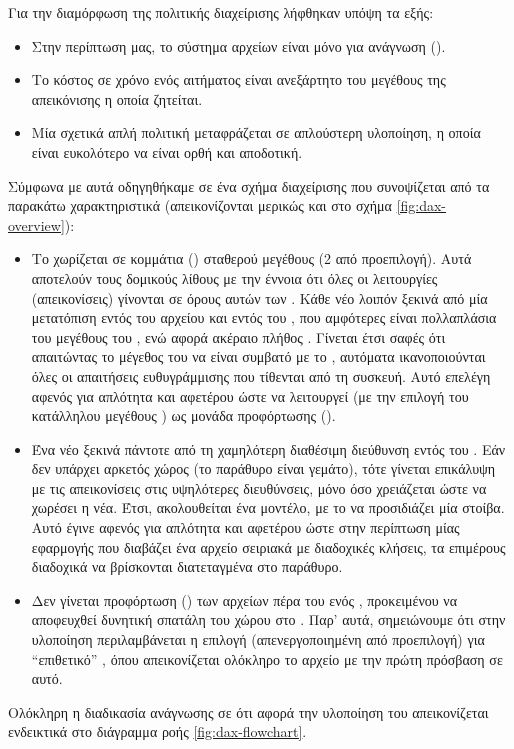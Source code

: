 Για την διαμόρφωση της πολιτικής διαχείρισης λήφθηκαν υπόψη τα εξής:
\begin{itemize}
    \item Στην περίπτωση μας, το σύστημα αρχείων είναι μόνο για ανάγνωση
          ().
    \item Το κόστος σε χρόνο ενός αιτήματος  είναι
          ανεξάρτητο του μεγέθους της απεικόνισης η οποία ζητείται.
    \item Μία σχετικά απλή πολιτική μεταφράζεται σε απλούστερη υλοποίηση,
          η οποία είναι ευκολότερο να είναι ορθή και αποδοτική.
\end{itemize}
Σύμφωνα με αυτά οδηγηθήκαμε σε ένα σχήμα διαχείρισης που συνοψίζεται από τα
παρακάτω χαρακτηριστικά (απεικονίζονται μερικώς και στο σχήμα
\ref{fig:dax-overview}):
\begin{itemize}
    \item Το  χωρίζεται σε κομμάτια (\emph{}) σταθερού
          μεγέθους (2  από προεπιλογή). Αυτά αποτελούν τους δομικούς
          λίθους με την έννοια ότι όλες οι λειτουργίες (απεικονίσεις) γίνονται
          σε όρους αυτών των . Κάθε νέο  λοιπόν ξεκινά
          από μία μετατόπιση εντός του αρχείου και εντός του ,
          που αμφότερες είναι πολλαπλάσια του μεγέθους του , ενώ αφορά
          ακέραιο πλήθος . Γίνεται έτσι σαφές ότι απαιτώντας το
          μέγεθος του  να είναι συμβατό με το ,
          αυτόματα ικανοποιούνται όλες οι απαιτήσεις ευθυγράμμισης που τίθενται
          από τη \viofs{} συσκευή. Αυτό επελέγη αφενός για απλότητα και αφετέρου
          ώστε να λειτουργεί (με την επιλογή του κατάλληλου μεγέθους )
          ως μονάδα προφόρτωσης ().
    \item Ένα νέο  ξεκινά πάντοτε από τη χαμηλότερη διαθέσιμη
          διεύθυνση εντός του . Εάν δεν υπάρχει αρκετός χώρος
          (το παράθυρο είναι γεμάτο), τότε γίνεται επικάλυψη με τις απεικονίσεις
          στις υψηλότερες διευθύνσεις, μόνο όσο χρειάζεται ώστε να χωρέσει η
          νέα. Έτσι, ακολουθείται ένα  μοντέλο,
          με το  να προσιδιάζει μία στοίβα. Αυτό έγινε αφενός
          για απλότητα και αφετέρου ώστε στην περίπτωση μίας εφαρμογής που
          διαβάζει ένα αρχείο σειριακά με διαδοχικές κλήσεις, τα επιμέρους
          διαδοχικά  να βρίσκονται διατεταγμένα στο παράθυρο.
    \item Δεν γίνεται προφόρτωση () των αρχείων πέρα του
          ενός , προκειμένου να αποφευχθεί δυνητική σπατάλη του χώρου
          στο . Παρ' αυτά, σημειώνουμε ότι στην υλοποίηση
          περιλαμβάνεται η επιλογή (απενεργοποιημένη από προεπιλογή) για
          ``επιθετικό'' , όπου απεικονίζεται ολόκληρο το αρχείο
          με την πρώτη πρόσβαση σε αυτό.
\end{itemize}
Ολόκληρη η διαδικασία ανάγνωσης σε ότι αφορά την υλοποίηση του \viofs{}
απεικονίζεται ενδεικτικά στο διάγραμμα ροής \ref{fig:dax-flowchart}.

